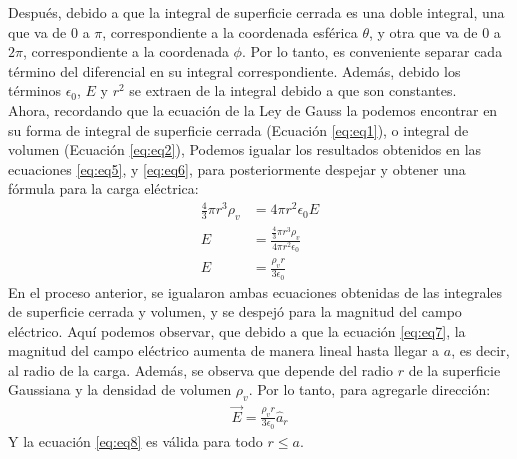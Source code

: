 \documentclass[12pt, letterpaper]{report}
\begin{document}
Después, debido a que la integral de superficie cerrada es una doble integral, una que va de $0$ a $\pi$, correspondiente a la coordenada esférica 
$\theta$, y otra que va de $0$ a $2\pi$, correspondiente a la coordenada $\phi$. Por lo tanto, es conveniente separar cada término del diferencial 
en su integral correspondiente. Además, debido los términos $\epsilon_0$, $E$ y $r^2$ se extraen de la integral debido a que son constantes. \\

Ahora, recordando que la ecuación de la Ley de Gauss la podemos encontrar en su forma de integral de superficie cerrada (Ecuación \ref{eq:eq1}), o integral de volumen (Ecuación \ref{eq:eq2}), 
Podemos igualar los resultados obtenidos en las ecuaciones \ref{eq:eq5}, y \ref{eq:eq6}, para posteriormente despejar y obtener una fórmula para la carga eléctrica: 
\begin{align}
\frac{4}{3}\pi r^3 \rho_v &= 4 \pi r^2 \epsilon_0 E \\ 
E &= \frac{\frac{4}{3}\pi r^3 \rho_v}{4\pi r^2 \epsilon_0} \\ 
E &= \frac{\rho_v r}{3 \epsilon_0} \label{eq:eq7}
\end{align}
En el proceso anterior, se igualaron ambas ecuaciones obtenidas de las integrales de superficie cerrada y volumen, y se despejó para la magnitud del campo eléctrico. Aquí podemos observar, que debido a que la ecuación 
\ref{eq:eq7}, la magnitud del campo eléctrico aumenta de manera lineal hasta llegar a $a$, es decir, al radio de la carga. Además, se observa que depende del radio $r$ de la superficie Gaussiana y la densidad de volumen 
$\rho_v$. Por lo tanto, para agregarle dirección: 
\begin{align}
\vec{E} = \frac{\rho_v r}{3\epsilon_0}\hat{a}_r \label{eq:eq8}
\end{align}
Y la ecuación \ref{eq:eq8} es válida para todo $r \leq a$. \\
\end{document}
